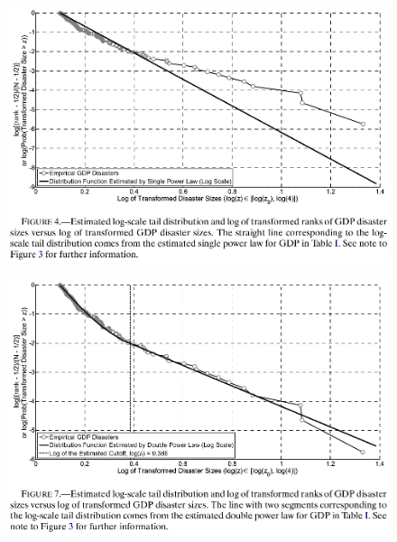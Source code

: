 \documentclass{beamer}
\begin{document}
\begin{frame}
  \begin{figure}
    \includegraphics[scale=.7]{barro_jin3.eps}
  \end{figure}
\end{frame}

\begin{frame}
  \begin{figure}
    \includegraphics[scale=.7]{barro_jin4.eps}
  \end{figure}
\end{frame}
\end{document}
